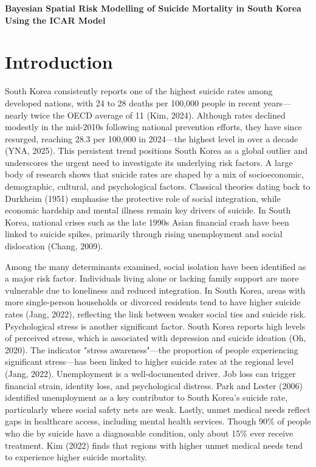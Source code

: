 \documentclass[11pt]{article}
\begin{document}
	
	\begin{center}
		\LARGE\textbf{Bayesian Spatial Risk Modelling of Suicide Mortality in South Korea Using the ICAR Model}
	\end{center}
	
	\section*{Introduction}
	
	South Korea consistently reports one of the highest suicide rates among developed nations, with 24 to 28 deaths per 100,000 people in recent years—nearly twice the OECD average of 11 (Kim, 2024). Although rates declined modestly in the mid-2010s following national prevention efforts, they have since resurged, reaching 28.3 per 100,000 in 2024—the highest level in over a decade (YNA, 2025). This persistent trend positions South Korea as a global outlier and underscores the urgent need to investigate its underlying risk factors. A large body of research shows that suicide rates are shaped by a mix of socioeconomic, demographic, cultural, and psychological factors. Classical theories dating back to Durkheim (1951) emphasise the protective role of social integration, while economic hardship and mental illness remain key drivers of suicide. In South Korea, national crises such as the late 1990s Asian financial crash have been linked to suicide spikes, primarily through rising unemployment and social dislocation (Chang, 2009).
	
	Among the many determinants examined, social isolation have been identified as a major risk factor. Individuals living alone or lacking family support are more vulnerable due to loneliness and reduced integration. In South Korea, areas with more single-person households or divorced residents tend to have higher suicide rates (Jang, 2022), reflecting the link between weaker social ties and suicide risk. Psychological stress is another significant factor. South Korea reports high levels of perceived stress, which is associated with depression and suicide ideation (Oh, 2020). The indicator "stress awareness"—the proportion of people experiencing significant stress—has been linked to higher suicide rates at the regional level (Jang, 2022). Unemployment is a well-documented driver. Job loss can trigger financial strain, identity loss, and psychological distress. Park and Lester (2006) identified unemployment as a key contributor to South Korea's suicide rate, particularly where social safety nets are weak. Lastly, unmet medical needs reflect gaps in healthcare access, including mental health services. Though 90\% of people who die by suicide have a diagnosable condition, only about 15\% ever receive treatment. Kim (2022) finds that regions with higher unmet medical needs tend to experience higher suicide mortality.
	
\end{document}
